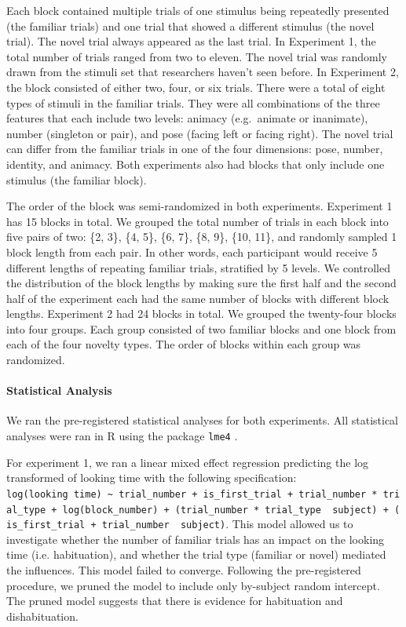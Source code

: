 \documentclass[
]{article}
\begin{document}
Each block contained multiple trials of one stimulus being repeatedly presented (the familiar trials) and one trial that showed a different stimulus (the novel trial). The novel trial always appeared as the last trial. In Experiment 1, the total number of trials ranged from two to eleven. The novel trial was randomly drawn from the stimuli set that researchers haven't seen before. In Experiment 2, the block consisted of either two, four, or six trials. There were a total of eight types of stimuli in the familiar trials. They were all combinations of the three features that each include two levels: animacy (e.g.~animate or inanimate), number (singleton or pair), and pose (facing left or facing right). The novel trial can differ from the familiar trials in one of the four dimensions: pose, number, identity, and animacy. Both experiments also had blocks that only include one stimulus (the familiar block).

The order of the block was semi-randomized in both experiments. Experiment 1 has 15 blocks in total. We grouped the total number of trials in each block into five pairs of two: \{2, 3\}, \{4, 5\}, \{6, 7\}, \{8, 9\}, \{10, 11\}, and randomly sampled 1 block length from each pair. In other words, each participant would receive 5 different lengths of repeating familiar trials, stratified by 5 levels. We controlled the distribution of the block lengths by making sure the first half and the second half of the experiment each had the same number of blocks with different block lengths. Experiment 2 had 24 blocks in total. We grouped the twenty-four blocks into four groups. Each group consisted of two familiar blocks and one block from each of the four novelty types. The order of blocks within each group was randomized.

\hypertarget{statistical-analysis-1}{%
\paragraph{Statistical Analysis}\label{statistical-analysis-1}}

We ran the pre-registered statistical analyses for both experiments. All statistical analyses were ran in R using the package \texttt{lme4} \autocite{bates2015package}.

For experiment 1, we ran a linear mixed effect regression predicting the log transformed of looking time with the following specification: \texttt{log(looking\ time)\ \textasciitilde{}\ trial\_number\ +\ is\_first\_trial\ +\ trial\_number\ *\ trial\_type\ +\ log(block\_number)\ +\ (trial\_number\ *\ trial\_type\ \textbar{}\ subject)\ +\ (is\_first\_trial\ +\ trial\_number\ \textbar{}\ subject)}. This model allowed us to investigate whether the number of familiar trials has an impact on the looking time (i.e. habituation), and whether the trial type (familiar or novel) mediated the influences. This model failed to converge. Following the pre-registered procedure, we pruned the model to include only by-subject random intercept. The pruned model suggests that there is evidence for habituation and dishabituation.
\end{document}
